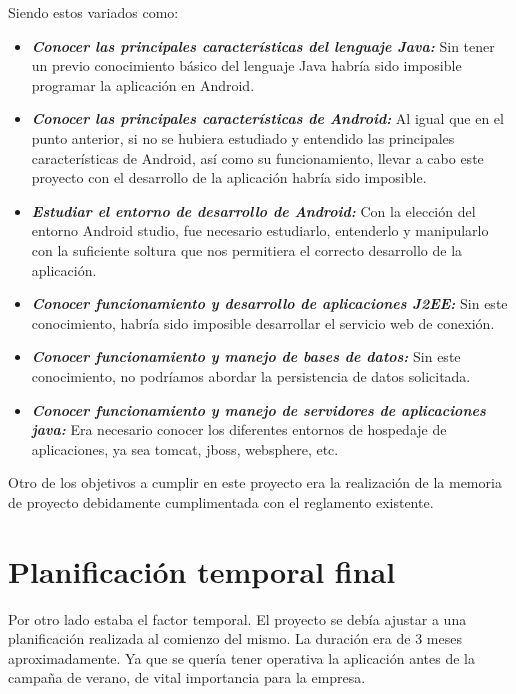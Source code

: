 Siendo estos variados como:
\begin{itemize}
	\item \emph{\textbf{Conocer las principales características del lenguaje Java:}} Sin tener un previo conocimiento básico del lenguaje Java habría sido imposible programar la aplicación en Android. 

	\item \emph{\textbf{Conocer las principales características de Android:}} Al igual que en el punto anterior, si no se hubiera estudiado y entendido las principales características de Android, así como su funcionamiento, llevar a cabo este proyecto con el desarrollo de la aplicación habría sido imposible. 

	\item \emph{\textbf{Estudiar el entorno de desarrollo de Android:}} Con la elección del entorno Android studio, fue necesario estudiarlo, entenderlo y manipularlo con la suficiente soltura que nos permitiera el correcto desarrollo de la aplicación. 

	\item \emph{\textbf{Conocer funcionamiento y desarrollo de aplicaciones J2EE:}}
Sin este conocimiento, habría sido imposible desarrollar el servicio web de conexión.

	\item \emph{\textbf{Conocer funcionamiento y manejo de bases de datos:}} Sin este conocimiento, no podríamos abordar la persistencia de datos solicitada. 

	\item \emph{\textbf{Conocer funcionamiento y manejo de servidores de aplicaciones java:}} Era necesario conocer los diferentes entornos de hospedaje de aplicaciones, ya sea tomcat, jboss, websphere, etc. 
	
\end{itemize}

Otro de los objetivos a cumplir en este proyecto era la realización de la memoria de proyecto debidamente cumplimentada con el reglamento existente. 

\section{Planificación temporal final}

Por otro lado estaba el factor temporal. El proyecto se debía ajustar a una planificación realizada al comienzo del mismo. La duración era de 3 meses aproximadamente. Ya que se quería tener operativa la aplicación antes de la campaña de verano, de vital importancia para la empresa. 

